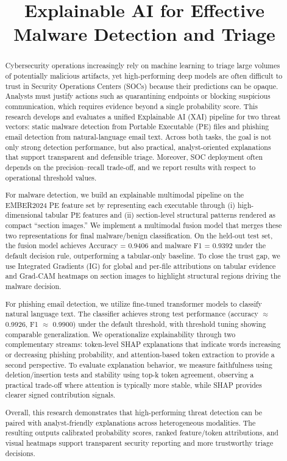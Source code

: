 \documentclass[conference]{IEEEtran}
\title{Explainable AI for Effective Malware Detection and Triage}
\author{\IEEEauthorblockN{Ananta Prasad Gaire, Aleksandar Shurbevski, Shozo Naito}
\IEEEauthorblockA{Kyoto College of Graduate Studies in Informatics (KCGI)\\
Kyoto, Japan\\
Emails: st052439@m2.kcg.edu, a\_shurbevski@kcg.edu, s\_naito@kcg.edu}}
\begin{document}
\maketitle

\begin{abstract}
Cybersecurity operations increasingly rely on machine learning to triage large volumes of potentially malicious artifacts, yet high-performing deep models are often difficult to trust in Security Operations Centers (SOCs) because their predictions can be opaque. Analysts must justify actions such as quarantining endpoints or blocking suspicious communication, which requires evidence beyond a single probability score. This research develops and evaluates a unified Explainable AI (XAI) pipeline for two threat vectors: static malware detection from Portable Executable (PE) files and phishing email detection from natural-language email text. Across both tasks, the goal is not only strong detection performance, but also practical, analyst-oriented explanations that support transparent and defensible triage. Moreover, SOC deployment often depends on the precision--recall trade-off, and we report results with respect to operational threshold values.

For malware detection, we build an explainable multimodal pipeline on the EMBER2024 PE feature set by representing each executable through (i) high-dimensional tabular PE features and (ii) section-level structural patterns rendered as compact “section images.” We implement a multimodal fusion model that merges these two representations for final malware/benign classification. On the held-out test set, the fusion model achieves Accuracy = 0.9406 and malware F1 = 0.9392 under the default decision rule, outperforming a tabular-only baseline. To close the trust gap, we use Integrated Gradients (IG) for global and per-file attributions on tabular evidence and Grad-CAM heatmaps on section images to highlight structural regions driving the malware decision.

For phishing email detection, we utilize fine-tuned transformer models to classify natural language text. The classifier achieves strong test performance (accuracy $\approx$ 0.9926, F1 $\approx$ 0.9900) under the default threshold, with threshold tuning showing comparable generalization. We operationalize explainability through two complementary streams: token-level SHAP explanations that indicate words increasing or decreasing phishing probability, and attention-based token extraction to provide a second perspective. To evaluate explanation behavior, we measure faithfulness using deletion/insertion tests and stability using top-k token agreement, observing a practical trade-off where attention is typically more stable, while SHAP provides clearer signed contribution signals.

Overall, this research demonstrates that high-performing threat detection can be paired with analyst-friendly explanations across heterogeneous modalities. The resulting outputs calibrated probability scores, ranked feature/token attributions, and visual heatmaps support transparent security reporting and more trustworthy triage decisions.
\end{abstract}
\end{document}
